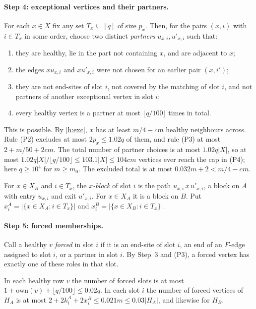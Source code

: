 \documentclass[11pt]{article}
\theoremstyle{definition}
\newcommand{\own}{\mathrm{own}}
\begin{document}
\paragraph{Step 4: exceptional vertices and their partners.} For each $x\in X$ fix any set $T_x\subseteq[q]$ of size $p_x$. Then, for the pairs $(x,i)$ with $i\in T_x$ in some order, choose two distinct \emph{partners} $u_{x,i},u'_{x,i}$ such that:
\begin{enumerate}[label=(P\arabic*),nosep]
\item they are healthy, lie in the part not containing $x$, and are adjacent to $x$;
\item the edges $xu_{x,i}$ and $xu'_{x,i}$ were not chosen for an earlier pair $(x,i')$;
\item they are not end-sites of slot $i$, not covered by the matching of slot $i$, and not partners of another exceptional vertex in slot $i$;
\item every healthy vertex is a partner at most $\lfloor q/100\rfloor$ times in total.
\end{enumerate}
This is possible. By \ref{h:exc}, $x$ has at least $m/4-cm$ healthy neighbours across. Rule (P2) excludes at most $2p_x\le1.02q$ of them, and rule (P3) at most $2+m/50+2cm$. The total number of partner choices is at most $1.02q|X|$, so at most $1.02q|X|/\lfloor q/100\rfloor\le103.1|X|\le104cm$ vertices ever reach the cap in (P4); here $q\ge10^4$ for $m\ge m_0$. The excluded total is at most $0.032m+2<m/4-cm$.

For $x\in X_B$ and $i\in T_x$, the \emph{$x$-block} of slot $i$ is the path $u_{x,i}\,x\,u'_{x,i}$, a block on $A$ with entry $u_{x,i}$ and exit $u'_{x,i}$. For $x\in X_A$ it is a block on $B$. Put $x^A_i=|\{x\in X_A:i\in T_x\}|$ and $x^B_i=|\{x\in X_B:i\in T_x\}|$.

\paragraph{Step 5: forced memberships.} Call a healthy $v$ \emph{forced} in slot $i$ if it is an end-site of slot $i$, an end of an $F$-edge assigned to slot $i$, or a partner in slot $i$. By Step~3 and (P3), a forced vertex has exactly one of these roles in that slot.

In each healthy row $v$ the number of forced slots is at most $1+\own(v)+\lfloor q/100\rfloor\le0.02q$. In each slot $i$ the number of forced vertices of $H_A$ is at most $2+2k^A_i+2x^B_i\le0.021m\le0.03|H_A|$, and likewise for $H_B$.
\end{document}
